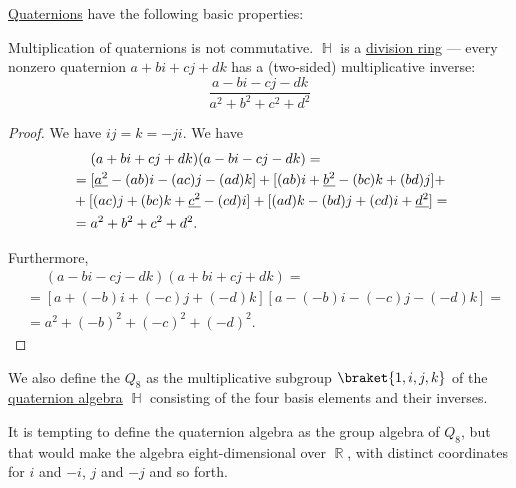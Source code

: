 \begin{proposition}\label{thm:def:quaternion_algebra}
  \hyperref[def:quaternion_algebra]{Quaternions} have the following basic properties:
  \begin{thmenum}
     Multiplication of quaternions is not commutative.
     \( \BbbH \) is a \hyperref[def:division_ring]{division ring} --- every nonzero quaternion \( a + bi + cj + dk \) has a (two-sided) multiplicative inverse:
    \begin{equation}\label{eq:thm:def:quaternion_algebra/inverse}
      \frac {a - bi - cj - dk} {a^2 + b^2 + c^2 + d^2}
    \end{equation}
  \end{thmenum}
\end{proposition}
\begin{proof}
   We have \( ij = k = -ji \).
   We have
  \begin{align*}
    &\phantom{{}={}}
    (a + bi + cj + dk) (a - bi - cj - dk)
    = \\ &=
    [\hi{a^2} - (ab)i - (ac)j - (ad)k]
    +
    [(ab)i + \hi{b^2} - (bc)k + (bd)j]
    + \\ &+
    [(ac)j + (bc)k + \hi{c^2} - (cd)i]
    +
    [(ad)k - (bd)j + (cd)i + \hi{d^2}]
    = \\ &=
    a^2 + b^2 + c^2 + d^2.
  \end{align*}

  Furthermore,
  \begin{align*}
    &\phantom{{}={}}
    (a - bi - cj - dk) (a + bi + cj + dk)
    = \\ &=
    [a + (-b) i + (-c) j + (-d) k] [a - (-b) i - (-c) j - (-d) k]
    = \\ &=
    a^2 + (-b)^2 + (-c)^2 + (-d)^2.
  \end{align*}
\end{proof}

\begin{definition}\label{def:quaternionic_group}
  We also define the  \( Q_8 \) as the multiplicative subgroup \( \braket{ 1, i, j, k } \) of the \hyperref[def:quaternion_algebra]{quaternion algebra} \( \BbbH \) consisting of the four basis elements and their inverses.
\end{definition}
\begin{comments}
  \item It is tempting to define the quaternion algebra as the group algebra of \( Q_8 \), but that would make the algebra eight-dimensional over \( \BbbR \), with distinct coordinates for \( i \) and \( -i \), \( j \) and \( -j \) and so forth.
\end{comments}

